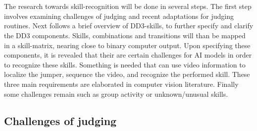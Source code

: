 \chapter{}%
\label{ch:stand-van-zaken}



The research towards skill-recognition will be done in several steps.
The first step involves examining challenges of judging and recent adaptations for judging routines.
Next follows a brief overview of DD3-skills, to further specify and clarify the DD3 components.
Skills, combinations and transitions will than be mapped in a skill-matrix, nearing close to binary computer output.
Upon specifying these components, it is revealed that their are certain challenges for AI models in order to recognize these skills.
Something is needed that can use video information to localize the jumper, sequence the video, and recognize the performed skill.
These three main requirements are elaborated in computer vision literature. %
Finally some challenges remain such as group activity or unknown/unusual skills.



\section{Challenges of judging}
\label{lit:challenges-of-judging}

